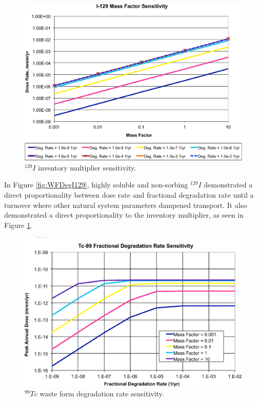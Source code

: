\begin{figure}[H]
  \centering
  \includegraphics[width=\linewidth]{I129_mass_factor.eps}
  \caption{$^{129}I$ inventory multiplier sensitivity.}
  \label{fig:WFDegI129MF}
\end{figure}


In Figure \ref{fig:WFDegI129}, highly soluble and non-sorbing $^{129}I$ 
demonstrated a direct proportionality between dose rate and fractional 
degradation rate until a turnover where other natural system parameters dampened 
transport. It also demonstrated a direct proportionality to the inventory 
multiplier, as seen in Figure \ref{fig:WFDegI129MF}. 

\begin{figure}[H]
  \centering
  \includegraphics[width=\linewidth]{Tc99_deg_rate.eps}
  \caption{$^{99}Tc$ waste form degradation rate sensitivity.}
  \label{fig:WFDegTc99}
\end{figure}

